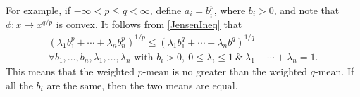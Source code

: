 \documentclass[]{amsart}
\begin{document}
For example, if $-\infty < p \le q < \infty$, define $a_i=b_i^p$, where $b_i>0$, and note that $\phi: x \mapsto x^{q/p}$ is convex.  It follows from \eqref{JensenIneq} that
\begin{multline} \label{JensenIneq}
( \lambda_1 b_1^p + \cdots + \lambda_n b_n^p )^{1/p} \le (\lambda_1 b_1^q + \cdots + \lambda_n b^q)^{1/q} \\ 
\forall b_1, \ldots, b_n,  \lambda_1 , \ldots, \lambda_n \text{ with } b_i>0, \ 0 \le \lambda_i \le 1 \ \& \ \lambda_1 + \cdots + \lambda_n = 1.
\end{multline}
This means that the weighted $p$-mean is no greater than the weighted $q$-mean.  If all the $b_i$ are the same, then the two means are equal.





\end{document}
